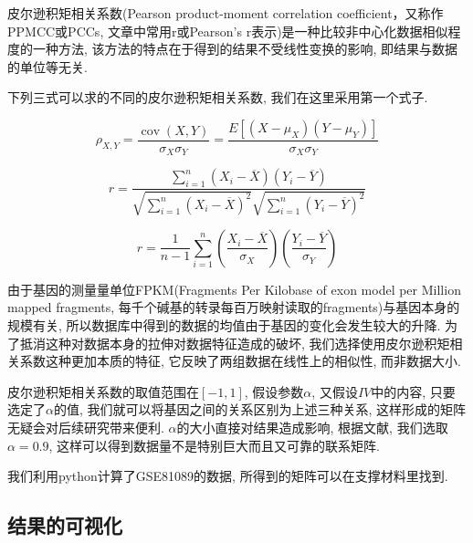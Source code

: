 \documentclass[zihao=-4]{ctexart}
\begin{document}
皮尔逊积矩相关系数(Pearson product-moment correlation coefficient，又称作PPMCC或PCCs, 文章中常用r或Pearson's r表示)是一种比较非中心化数据相似程度的一种方法, 该方法的特点在于得到的结果不受线性变换的影响, 即结果与数据的单位等无关.

下列三式可以求的不同的皮尔逊积矩相关系数, 我们在这里采用第一个式子.

\begin{equation}
    \rho_{X, Y}=\frac{\operatorname{cov}(X, Y)}{\sigma_{X} \sigma_{Y}}=\frac{E\left[\left(X-\mu_{X}\right)\left(Y-\mu_{Y}\right)\right]}{\sigma_{X} \sigma_{Y}}
\end{equation}

\begin{equation*}
    r=\frac{\sum_{i=1}^{n}\left(X_{i}-\overline{X}\right)\left(Y_{i}-\overline{Y}\right)}{\sqrt{\sum_{i=1}^{n}\left(X_{i}-\overline{X}\right)^{2}} \sqrt{\sum_{i=1}^{n}\left(Y_{i}-\overline{Y}\right)^{2}}}
\end{equation*}

\begin{equation*}
    r=\frac{1}{n-1} \sum_{i=1}^{n}\left(\frac{X_{i}-\overline{X}}{\sigma_{X}}\right)\left(\frac{Y_{i}-\overline{Y}}{\sigma_{Y}}\right)
\end{equation*}

由于基因的测量量单位FPKM(Fragments Per Kilobase of exon model per Million mapped fragments, 每千个碱基的转录每百万映射读取的fragments)与基因本身的规模有关, 所以数据库中得到的数据的均值由于基因的变化会发生较大的升降. 为了抵消这种对数据本身的拉伸对数据特征造成的破坏, 我们选择使用皮尔逊积矩相关系数这种更加本质的特征, 它反映了两组数据在线性上的相似性, 而非数据大小. 

皮尔逊积矩相关系数的取值范围在$[-1,1]$, 假设参数$\alpha$, 又假设$IV$中的内容, 只要选定了$\alpha$的值, 我们就可以将基因之间的关系区别为上述三种关系, 这样形成的矩阵无疑会对后续研究带来便利. $\alpha$的大小直接对结果造成影响, 根据文献\cite{wiki:pierxun}, 我们选取$\alpha=0.9$, 这样可以得到数据量不是特别巨大而且又可靠的联系矩阵.

我们利用python计算了GSE81089的数据, 所得到的矩阵可以在支撑材料里找到.

\subsection{结果的可视化}
\end{document}
